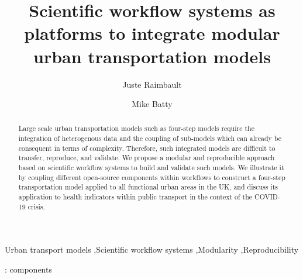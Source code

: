 \documentclass[3p,times,procedia]{elsarticle}
\begin{document}
\begin{frontmatter}


\title{Scientific workflow systems as platforms to integrate modular urban transportation models}

\author[a,b,c]{Juste Raimbault}
\author[a]{Mike Batty}

\address[a]{CASA, University College London, London, United Kingdom}
\address[b]{UPS CNRS 3611 Complex Systems Institute, Paris, France}
\address[c]{UMR CNRS 8504 G{\'e}ographie-cit{\'e}s, Paris, France}

\begin{abstract}
Large scale urban transportation models such as four-step models require the integration of heterogenous data and the coupling of sub-models which can already be consequent in terms of complexity. Therefore, such integrated models are difficult to transfer, reproduce, and validate. We propose a modular and reproducible approach based on scientific workflow systems to build and validate such models. We illustrate it by coupling different open-source components within workflows to construct a four-step transportation model applied to all functional urban areas in the UK, and discuss its application to health indicators within public transport in the context of the COVID-19 crisis.
\end{abstract}

\begin{keyword}
Urban transport models \sep Scientific workflow systems \sep Modularity \sep Reproducibility
\end{keyword}
\end{frontmatter}





\cite{argent2004overview} : components

\cite{lovelace2020open}

\cite{cheetham2021determining}

\cite{leung2021real}
\end{document}
